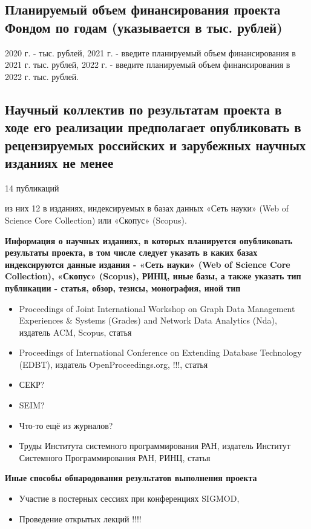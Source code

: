 \documentclass[12pt]{article}  %
\theoremstyle{remark}
\begin{document}
\subsection{Планируемый объем финансирования проекта Фондом по годам (указывается в тыс. рублей)}
2020 г. - тыс. рублей,
2021 г. - введите планируемый объем финансирования в 2021 г. тыс. рублей,
2022 г. - введите планируемый объем финансирования в 2022 г. тыс. рублей.

\subsection{Научный коллектив по результатам проекта в ходе его реализации предполагает опубликовать в рецензируемых российских и зарубежных научных изданиях не менее}

14 публикаций

из них 12 в изданиях, индексируемых в базах данных «Сеть науки» (Web of Science Core Collection) или «Скопус» (Scopus).

\textbf{Информация о научных изданиях, в которых планируется опубликовать результаты проекта, в том числе следует указать в каких базах индексируются данные издания - «Сеть науки» (Web of Science Core Collection), «Скопус» (Scopus), РИНЦ, иные базы, а также указать тип публикации - статья, обзор, тезисы, монография, иной тип}
\begin{itemize}
  \item Proceedings of Joint International Workshop on Graph Data Management Experiences \& Systems (Grades) and Network Data Analytics (Nda), издатель  ACM, Scopus, статья
  \item Proceedings of International Conference on Extending Database Technology (EDBT), издатель OpenProceedings.org, !!!, статья
  \item СЕКР?
  \item SEIM?
  \item Что-то ещё из журналов?
  \item Труды Института системного программирования РАН, издатель Институт Системного Программирования РАН, РИНЦ, статья
\end{itemize}

\textbf{Иные способы обнародования результатов выполнения проекта}
\begin{itemize}
\item Участие в постерных сессиях при конференциях SIGMOD,
\item Проведение открытых лекций !!!!

\end{itemize}
\end{document}
